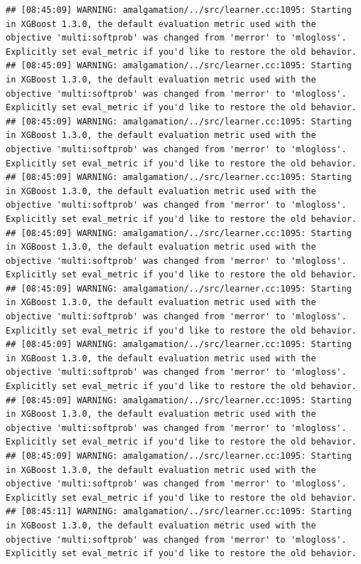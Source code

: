 \documentclass[
]{scrbook}
\begin{document}
\begin{verbatim}
## [08:45:09] WARNING: amalgamation/../src/learner.cc:1095: Starting in XGBoost 1.3.0, the default evaluation metric used with the objective 'multi:softprob' was changed from 'merror' to 'mlogloss'. Explicitly set eval_metric if you'd like to restore the old behavior.
## [08:45:09] WARNING: amalgamation/../src/learner.cc:1095: Starting in XGBoost 1.3.0, the default evaluation metric used with the objective 'multi:softprob' was changed from 'merror' to 'mlogloss'. Explicitly set eval_metric if you'd like to restore the old behavior.
## [08:45:09] WARNING: amalgamation/../src/learner.cc:1095: Starting in XGBoost 1.3.0, the default evaluation metric used with the objective 'multi:softprob' was changed from 'merror' to 'mlogloss'. Explicitly set eval_metric if you'd like to restore the old behavior.
## [08:45:09] WARNING: amalgamation/../src/learner.cc:1095: Starting in XGBoost 1.3.0, the default evaluation metric used with the objective 'multi:softprob' was changed from 'merror' to 'mlogloss'. Explicitly set eval_metric if you'd like to restore the old behavior.
## [08:45:09] WARNING: amalgamation/../src/learner.cc:1095: Starting in XGBoost 1.3.0, the default evaluation metric used with the objective 'multi:softprob' was changed from 'merror' to 'mlogloss'. Explicitly set eval_metric if you'd like to restore the old behavior.
## [08:45:09] WARNING: amalgamation/../src/learner.cc:1095: Starting in XGBoost 1.3.0, the default evaluation metric used with the objective 'multi:softprob' was changed from 'merror' to 'mlogloss'. Explicitly set eval_metric if you'd like to restore the old behavior.
## [08:45:09] WARNING: amalgamation/../src/learner.cc:1095: Starting in XGBoost 1.3.0, the default evaluation metric used with the objective 'multi:softprob' was changed from 'merror' to 'mlogloss'. Explicitly set eval_metric if you'd like to restore the old behavior.
## [08:45:09] WARNING: amalgamation/../src/learner.cc:1095: Starting in XGBoost 1.3.0, the default evaluation metric used with the objective 'multi:softprob' was changed from 'merror' to 'mlogloss'. Explicitly set eval_metric if you'd like to restore the old behavior.
## [08:45:09] WARNING: amalgamation/../src/learner.cc:1095: Starting in XGBoost 1.3.0, the default evaluation metric used with the objective 'multi:softprob' was changed from 'merror' to 'mlogloss'. Explicitly set eval_metric if you'd like to restore the old behavior.
## [08:45:11] WARNING: amalgamation/../src/learner.cc:1095: Starting in XGBoost 1.3.0, the default evaluation metric used with the objective 'multi:softprob' was changed from 'merror' to 'mlogloss'. Explicitly set eval_metric if you'd like to restore the old behavior.

\end{verbatim}
\end{document}
